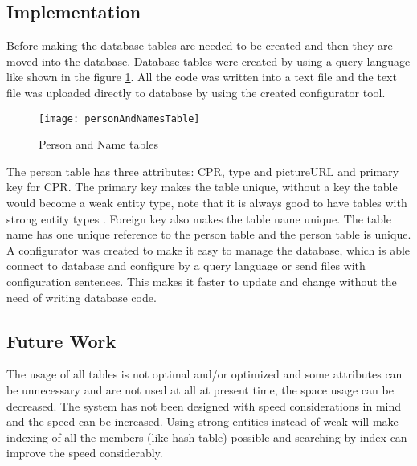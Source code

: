 \subsection{Implementation}

Before making the database tables are needed to be created and then they are moved into the database. Database tables were created by using a query language like shown in the figure \ref{fig:personAndNamesTable}. All the code was written into a text file and the text file was uploaded directly to database by using the created configurator tool.

\begin{figure}[h]
	\centering
		\texttt{[image: personAndNamesTable]}
	\caption{Person and Name tables}
	\label{fig:personAndNamesTable}
\end{figure}

The person table has three attributes: CPR, type and pictureURL and primary key for CPR. The primary key makes the table unique, without a key the table would become a weak entity type, note that it is always good to have tables with strong entity types \cite{bib4}. Foreign key also makes the table name unique. The table name has one unique reference to the person table and the person table is unique. \\ A configurator was created to make it easy to manage the database, which is able connect to database and configure by a query language or send files with configuration sentences. This makes it faster to update and change without the need of writing database code. 

\subsection{Future Work}

The usage of all tables is not optimal and/or optimized and some attributes can be unnecessary and are not used at all at present time, the space usage can be decreased. The system has not been designed with speed considerations in mind and the speed can be increased. Using strong entities instead of weak will make indexing of all the members (like hash table) possible and searching by index can improve the speed considerably.